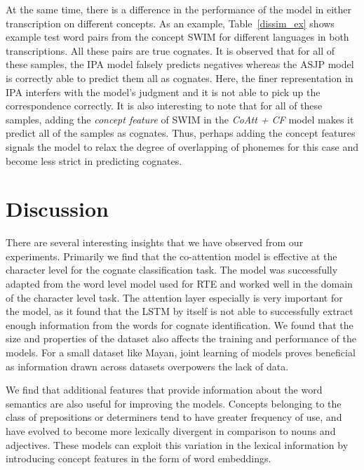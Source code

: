 \documentclass[11pt,letterpaper]{article}
\begin{document}
At the same time, there is a difference in the performance of the model in either transcription on different concepts. As an example, Table~\ref{dissim_ex} shows example test word pairs from the concept SWIM for different languages in both transcriptions. All these pairs are true cognates. It is observed that for all of these samples, the IPA model falsely predicts negatives whereas the ASJP model is correctly able to predict them all as cognates. Here, the finer representation in IPA interfers with the model's judgment and it is not able to pick up the correspondence correctly. It is also interesting to note that for all of these samples, adding the \textit{concept feature} of SWIM in the \textit{CoAtt + CF} model makes it predict all of the samples as cognates. Thus, perhaps adding the concept features signals the model to relax the degree of overlapping of phonemes for this case and become less strict in predicting cognates.

\section{Discussion}

There are several interesting insights that we have observed from our experiments. Primarily we find that the co-attention model is effective at the character level for the cognate classification task. The model was successfully adapted from the word level model used for RTE and worked well in the domain of the character level task. The attention layer especially is very important for the model, as it found that the LSTM by itself is not able to successfully extract enough information from the words for cognate identification. We found that the size and properties of the dataset also affects the training and performance of the models. For a small dataset like Mayan, joint learning of models proves beneficial as information drawn across datasets overpowers the lack of data.

We find that additional features that provide information about the word semantics are also useful for improving the models. Concepts belonging to the class of prepositions or determiners tend to have greater frequency of use, and have evolved to become more lexically divergent in comparison to nouns and adjectives. These models can exploit this variation in the lexical information by introducing concept features in the form of word embeddings. 
\end{document}
